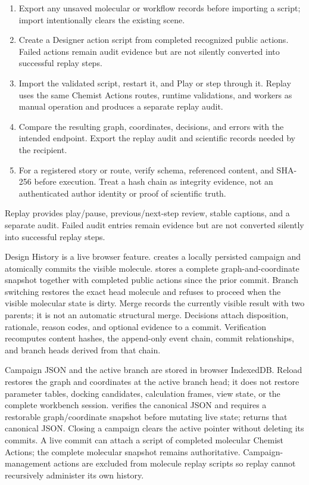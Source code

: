 \documentclass[11pt]{article}
\begin{document}
\begin{enumerate}
\item Export any unsaved molecular or workflow records before importing a script; import intentionally clears the existing scene.
\item Create a Designer action script from completed recognized public actions. Failed actions remain audit evidence but are not silently converted into successful replay steps.
\item Import the validated script, restart it, and Play or step through it. Replay uses the same Chemist Actions routes, runtime validations, and workers as manual operation and produces a separate replay audit.
\item Compare the resulting graph, coordinates, decisions, and errors with the intended endpoint. Export the replay audit and scientific records needed by the recipient.
\item For a registered story or route, verify schema, referenced content, and SHA-256 before execution. Treat a hash chain as integrity evidence, not an authenticated author identity or proof of scientific truth.
\end{enumerate}

Replay provides play/pause, previous/next-step review, stable captions, and a separate audit. Failed audit entries remain evidence but are not converted silently into successful replay steps.


Design History is a live browser feature.  creates a locally persisted campaign and atomically commits the visible molecule.  stores a complete graph-and-coordinate snapshot together with completed public actions since the prior commit. Branch switching restores the exact head molecule and refuses to proceed when the visible molecular state is dirty. Merge records the currently visible result with two parents; it is not an automatic structural merge. Decisions attach disposition, rationale, reason codes, and optional evidence to a commit. Verification recomputes content hashes, the append-only event chain, commit relationships, and branch heads derived from that chain.

Campaign JSON and the active branch are stored in browser IndexedDB. Reload restores the graph and coordinates at the active branch head; it does not restore parameter tables, docking candidates, calculation frames, view state, or the complete workbench session.  verifies the canonical JSON and requires a restorable graph/coordinate snapshot before mutating live state;  returns that canonical JSON. Closing a campaign clears the active pointer without deleting its commits. A live commit can attach a script of completed molecular Chemist Actions; the complete molecular snapshot remains authoritative. Campaign-management actions are excluded from molecule replay scripts so replay cannot recursively administer its own history.
\end{document}
